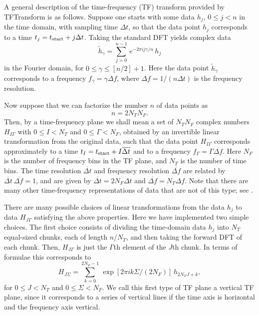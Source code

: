 A general description of the time-frequency (TF) transform provided by
TFTransform is as follows.  Suppose one starts with some data $h_j$, $0 \le j
< n$ in the time domain, with sampling time $\Delta t$, so that the data point
$h_j$ corresponds to a time $t_j = t_{\rm start} + j \Delta t$.  Taking the
standard DFT yields complex data
\begin{equation}
{\tilde h}_\gamma = \sum_{j=0}^{n-1} \, e^{-2 \pi i j \gamma / n} \, h_j
\label{standarddft}
\end{equation}
in the Fourier domain, for $0 \le \gamma \le [n/2]+1$.  Here the data point
${\tilde h}_\gamma$ corresponds to a frequency $f_\gamma = \gamma \Delta f$,
where $\Delta f= 1/(n \Delta t)$ is the frequency resolution.


Now suppose that we can factorize the number $n$ of data points as
\begin{equation}
n = 2 N_T N_F.
\end{equation}
Then, by a time-frequency plane we shall mean a set of $N_T N_F$ complex
numbers $H_{I\Gamma}$ with $0 \le I < N_T$ and $0 \le \Gamma < N_F$, obtained
by an invertible linear transformation from the original data, such  that the
data point $H_{I\Gamma}$ corresponds approximately to a time $t_I = t_{\rm
start} + I {\overline {\Delta t}}$ and to a frequency $f_\Gamma = \Gamma
{\overline {\Delta f}}$.  Here $N_F$ is the number of frequency bins in the TF
plane, and $N_T$ is the number of time bins.  The time resolution ${\overline
{\Delta t}}$ and frequency resolution ${\overline {\Delta f}}$ are related by
${\overline {\Delta t}} \ {\overline {\Delta f}} =1$, and are given by
${\overline {\Delta t}} = 2 N_F \Delta t$ and ${\overline {\Delta f}} = N_T
\Delta f$.  Note that there are many other time-frequency representations
of data that are not of this type; see \cite{ab:1999}.


There are many possible choices of linear transformations from the data $h_j$
to data $H_{J\Gamma}$ satisfying the above properties.  Here we have
implemented two simple choices.  The first choice consists of dividing the
time-domain data $h_j$ into $N_T$ equal-sized chunks, each of length $n/N_T$,
and then taking the forward DFT of each chunk.  Then, $H_{J\Gamma}$ is just
the $\Gamma$th element of the $J$th chunk.  In terms of formulae this
corresponds to
\begin{equation}
H_{J\Sigma} = \sum_{k=0}^{2 N_F-1} \, \exp \left[ 2 \pi i k \Sigma / (2
N_F) \right] \, h_{2 N_F J + k},
\label{verticalTFP}
\end{equation}
for $0 \le J < N_T$ and $0 \le \Sigma < N_F$.  We call this first type
of TF plane a vertical TF plane, since it corresponds to a series of
vertical lines if the time axis is horizontal and the frequency axis
vertical.

